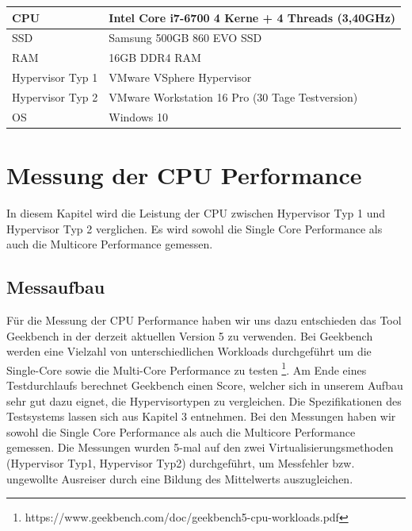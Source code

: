 \documentclass[conference]{IEEEtran}
\begin{document}
\begin{table}[!h]
\begin{tabular}{|l|l|}
\hline
CPU              & Intel Core i7-6700 4 Kerne + 4 Threads (3,40GHz) \\ \hline
SSD              & Samsung 500GB 860 EVO SSD                        \\ \hline
RAM              & 16GB DDR4 RAM                                    \\ \hline
Hypervisor Typ 1 & VMware VSphere Hypervisor                        \\ \hline
Hypervisor Typ 2 & VMware Workstation 16 Pro (30 Tage Testversion)  \\ \hline
OS               & Windows 10                                       \\ \hline
\end{tabular}
\end{table}

\section{Messung der CPU Performance}
\label{Messung der CPU Performance}
In diesem Kapitel wird die Leistung der CPU zwischen Hypervisor Typ 1 und Hypervisor Typ 2 verglichen. Es wird sowohl die Single Core Performance als auch die Multicore Performance gemessen.

\subsection{Messaufbau}
Für die Messung der CPU Performance haben wir uns dazu entschieden das Tool Geekbench in der derzeit aktuellen Version 5 zu verwenden. Bei Geekbench werden eine Vielzahl von unterschiedlichen Workloads durchgeführt um die Single-Core sowie die Multi-Core Performance zu testen \footnote{https://www.geekbench.com/doc/geekbench5-cpu-workloads.pdf}. Am Ende eines Testdurchlaufs berechnet Geekbench einen Score, welcher sich in unserem Aufbau sehr gut dazu eignet, die Hypervisortypen zu vergleichen. Die Spezifikationen des Testsystems lassen sich aus Kapitel 3 entnehmen.
Bei den Messungen haben wir sowohl die Single Core Performance als auch die Multicore Performance gemessen.  Die Messungen wurden 5-mal auf den zwei Virtualisierungsmethoden (Hypervisor Typ1, Hypervisor Typ2) durchgeführt, um Messfehler bzw. ungewollte Ausreiser durch eine Bildung des Mittelwerts auszugleichen.
\end{document}
